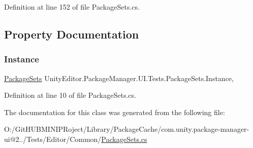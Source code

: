 Definition at line 152 of file Package\+Sets.\+cs.



\subsection{Property Documentation}
\mbox{\label{class_unity_editor_1_1_package_manager_1_1_u_i_1_1_tests_1_1_package_sets_a8330e0a210e88e4598e34dbef1a17430}} 
\subsubsection{\texorpdfstring{Instance}{Instance}}
{\footnotesize\ttfamily \mbox{\hyperlink{class_unity_editor_1_1_package_manager_1_1_u_i_1_1_tests_1_1_package_sets}{Package\+Sets}} Unity\+Editor.\+Package\+Manager.\+U\+I.\+Tests.\+Package\+Sets.\+Instance\hspace{0.3cm}{\ttfamily [static]}, {\ttfamily [get]}}



Definition at line 10 of file Package\+Sets.\+cs.



The documentation for this class was generated from the following file\+:\begin{DoxyCompactItemize}
\item 
O\+:/\+Git\+H\+U\+B\+M\+I\+N\+I\+P\+Roject/\+Library/\+Package\+Cache/com.\+unity.\+package-\/manager-\/ui@2../\+Tests/\+Editor/\+Common/\mbox{\hyperlink{_package_sets_8cs}{Package\+Sets.\+cs}}\end{DoxyCompactItemize}
